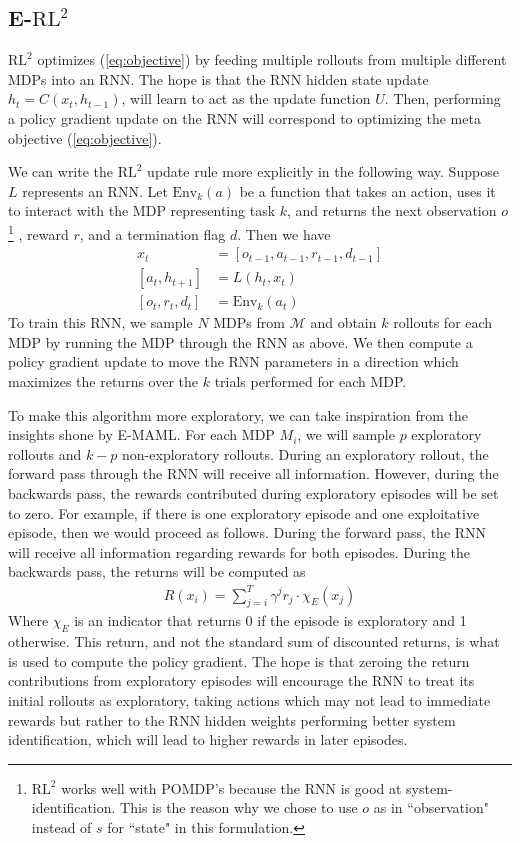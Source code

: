 \documentclass{article} %
\begin{document}
\subsection{E-$\text{RL}^2$}

$\text{RL}^2$ optimizes (\ref{eq:objective}) by feeding multiple rollouts from multiple different MDPs into an RNN. The hope is that the RNN hidden state update $h_t = C(x_t, h_{t-1})$, will learn to act as the update function $U$. Then, performing a policy gradient update on the RNN will correspond to optimizing the meta objective (\ref{eq:objective}). 

We can write the $\text{RL}^2$ update rule more explicitly in the following way. Suppose $L$ represents an RNN. Let $\text{Env}_k(a)$ be a function that takes an action, uses it to interact with the MDP representing task $k$, and returns the next observation $o$
\footnote{$\text{RL}^2$ works well with POMDP's because the RNN is good at system-identification. This is the reason why we chose to use $o$ as in ``observation" instead of $s$ for ``state" in this formulation.}
, reward $r$, and a termination flag $d$. Then we have 
\begin{align}
    x_t &= \left[o_{t-1}, a_{t-1}, r_{t-1}, d_{t-1} \right] \\
    \left[ a_t, h_{t+1}\right] &= L(h_t, x_t) \\
    \left[ o_t, r_t, d_t \right] &= \text{Env}_k(a_t)
\end{align}
To train this RNN, we sample $N$ MDPs from $\mathcal{M}$ and obtain $k$ rollouts for each MDP by running the MDP through the RNN as above. We then compute a policy gradient update to move the RNN parameters in a direction which maximizes the returns over the $k$ trials performed for each MDP. 

To make this algorithm more exploratory, we can take inspiration from the insights shone by E-MAML. For each MDP $M_i$, we will sample $p$ exploratory rollouts and $k-p$ non-exploratory rollouts. During an exploratory rollout, the forward pass through the RNN will receive all information. However, during the backwards pass, the rewards contributed during exploratory episodes will be set to zero. For example, if there is one exploratory episode and one exploitative episode, then we would proceed as follows. During the forward pass, the RNN will receive all information regarding rewards for both episodes. During the backwards pass, the returns will be computed as
\begin{align}
    R(x_i) = \sum_{j=i}^{T} \gamma^j r_j \cdot \chi_E(x_j)
\end{align}
Where $\chi_E$ is an indicator that returns 0 if the episode is exploratory and 1 otherwise. This return, and not the standard sum of discounted returns, is what is used to compute the policy gradient. The hope is that zeroing the return contributions from exploratory episodes will encourage the RNN to treat its initial rollouts as exploratory, taking actions which may not lead to immediate rewards but rather to the RNN hidden weights performing better system identification, which will lead to higher rewards in later episodes.     
\end{document}
